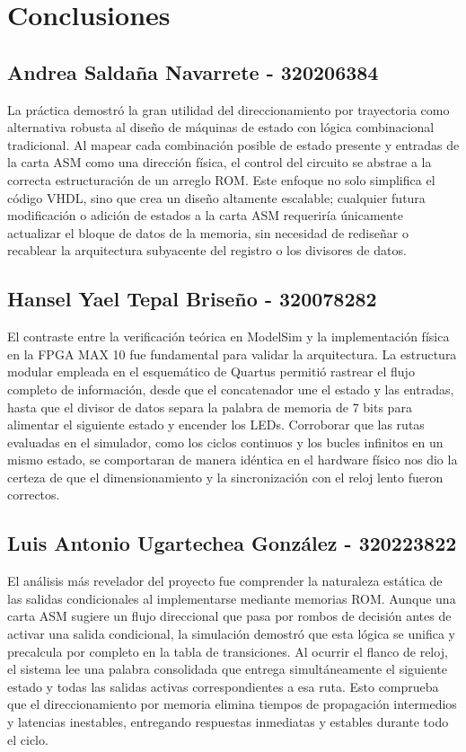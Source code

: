 \documentclass[12pt, letterpaper]{article}
\begin{document}
\section*{Conclusiones}

\subsection*{Andrea Saldaña Navarrete - 320206384}

La práctica demostró la gran utilidad del direccionamiento por trayectoria como alternativa robusta al diseño de máquinas de estado con lógica combinacional tradicional. Al mapear cada combinación posible de estado presente y entradas de la carta ASM como una dirección física, el control del circuito se abstrae a la correcta estructuración de un arreglo ROM. Este enfoque no solo simplifica el código VHDL, sino que crea un diseño altamente escalable; cualquier futura modificación o adición de estados a la carta ASM requeriría únicamente actualizar el bloque de datos de la memoria, sin necesidad de rediseñar o recablear la arquitectura subyacente del registro o los divisores de datos.

\subsection*{Hansel Yael Tepal Briseño - 320078282}

El contraste entre la verificación teórica en ModelSim y la implementación física en la FPGA MAX 10 fue fundamental para validar la arquitectura. La estructura modular empleada en el esquemático de Quartus permitió rastrear el flujo completo de información, desde que el concatenador une el estado y las entradas, hasta que el divisor de datos separa la palabra de memoria de 7 bits para alimentar el siguiente estado y encender los LEDs. Corroborar que las rutas evaluadas en el simulador, como los ciclos continuos y los bucles infinitos en un mismo estado, se comportaran de manera idéntica en el hardware físico nos dio la certeza de que el dimensionamiento y la sincronización con el reloj lento fueron correctos.

\subsection*{Luis Antonio Ugartechea González - 320223822}

El análisis más revelador del proyecto fue comprender la naturaleza estática de las salidas condicionales al implementarse mediante memorias ROM. Aunque una carta ASM sugiere un flujo direccional que pasa por rombos de decisión antes de activar una salida condicional, la simulación demostró que esta lógica se unifica y precalcula por completo en la tabla de transiciones. Al ocurrir el flanco de reloj, el sistema lee una palabra consolidada que entrega simultáneamente el siguiente estado y todas las salidas activas correspondientes a esa ruta. Esto comprueba que el direccionamiento por memoria elimina tiempos de propagación intermedios y latencias inestables, entregando respuestas inmediatas y estables durante todo el ciclo.


\end{document}

